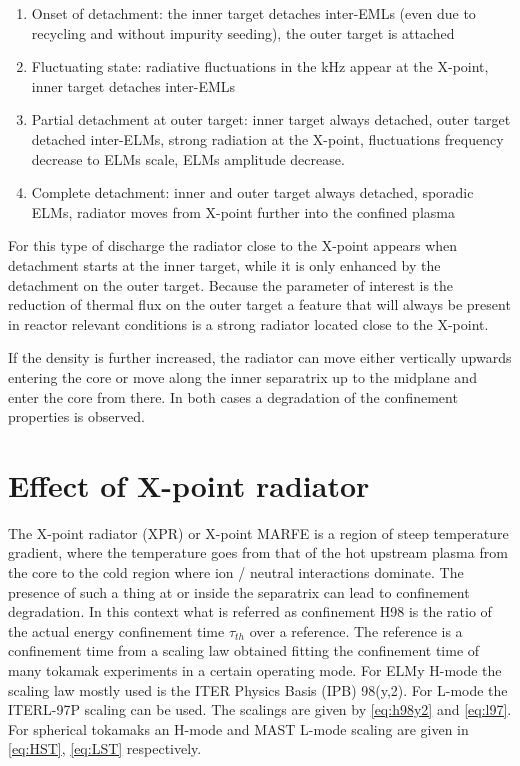 \begin{enumerate}
    \item Onset of detachment: the inner target detaches inter-EMLs (even due to recycling and without impurity seeding), the outer target is attached
    \item Fluctuating state: radiative fluctuations in the kHz appear at the X-point, inner target detaches inter-EMLs
    \item Partial detachment at outer target: inner target always detached, outer target detached inter-ELMs, strong radiation at the X-point, fluctuations frequency decrease to ELMs scale, ELMs amplitude decrease.
    \item Complete detachment: inner and outer target always detached, sporadic ELMs, radiator moves from X-point further into the confined plasma
\end{enumerate}

For this type of discharge the radiator close to the X-point appears when detachment starts at the inner target, while it is only enhanced by the detachment on the outer target. Because the parameter of interest is the reduction of thermal flux on the outer target a feature that will always be present in reactor relevant conditions is a strong radiator located close to the X-point.

If the density is further increased, the radiator can move either vertically upwards entering the core\cite{Bernert2021} or move along the inner separatrix up to the midplane and enter the core from there.\cite{Lipschultz1984} In both cases a degradation of the confinement properties is observed.

\section{Effect of X-point radiator}\label{Effect of X-point radiator}


The X-point radiator (XPR)\cite{Bernert2021} or X-point MARFE\cite{Kallenbach2015a} is a region of steep temperature gradient, where the temperature goes from that of the hot upstream plasma from the core to the cold region where ion / neutral interactions dominate. The presence of such a thing at or inside the separatrix can lead to confinement degradation. In this context what is referred as confinement H98 is the ratio of the actual energy confinement time $\tau_{th}$ over a reference. The reference is a confinement time from a scaling law obtained fitting the confinement time of many tokamak experiments in a certain operating mode. For ELMy H-mode the scaling law mostly used is the ITER Physics Basis (IPB) 98(y,2).\cite{Doyle2007} For L-mode the ITERL-97P scaling can be used. \cite{Kaye1997} The scalings are given by \autoref{eq:h98y2} and \ref{eq:l97}. For spherical tokamaks an H-mode \cite{Kaye2006} and MAST L-mode \cite{Kaye2021} scaling are given in \autoref{eq:HST}, \ref{eq:LST} respectively.


